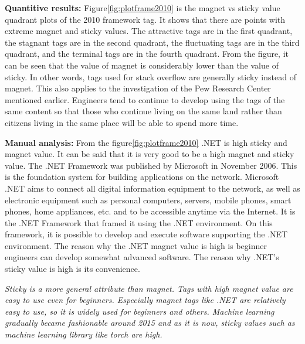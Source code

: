 \documentclass[conference]{IEEEtran}
\begin{document}
\textbf{Quantitive results:}
Figure\ref{fig:plotframe2010} is the magnet vs sticky value quadrant plots of the 2010 framework tag. It shows that there are points with extreme magnet and sticky values. The attractive tags are in the first quadrant, the stagnant tags are in the second quadrant, the fluctuating tags are in the third quadrant, and the terminal tags are in the fourth quadrant. From the figure, it can be seen that the value of magnet is considerably lower than the value of sticky. In other words, tags used for stack overflow are generally sticky instead of magnet. This also applies to the investigation of the Pew Research Center mentioned earlier. Engineers tend to continue to develop using the tags of the same content so that those who continue living on the same land rather than citizens living in the same place will be able to spend more time. 
\smallskip
\smallskip

\textbf{Manual analysis:}
From the figure\ref{fig:plotframe2010} .NET is high sticky and magnet value. It can be said that it is very good to be a high magnet and sticky value. The .NET Framework was published by Microsoft in November 2006. This is the foundation system for building applications on the network.  Microsoft .NET aims to connect all digital information equipment to the network, as well as electronic equipment such as personal computers, servers, mobile phones, smart phones, home appliances, etc. and to be accessible anytime via the Internet. It is the .NET Framework that framed it using the .NET environment. On this framework, it is possible to develop and execute software supporting the .NET environment. The reason why the .NET magnet value is high is beginner engineers can develop somewhat advanced software. The reason why .NET's sticky value is high is its convenience.
\medskip
 
\begin{oframed}
 \emph{Sticky is a more general attribute than magnet. Tags with high magnet value are easy to use even for beginners. Especially magnet tags like .NET are relatively easy to use, so it is widely used for beginners and others. Machine learning gradually became fashionable around 2015 and as it is now, sticky values such as machine learning library like torch are high.}
\end{oframed}
\medskip
\end{document}

